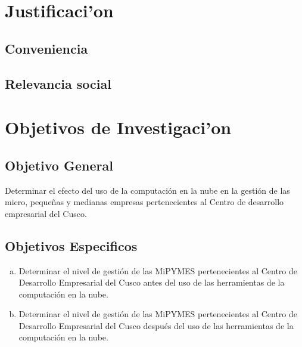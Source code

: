 \section{Justificaci'on}
\subsection{Conveniencia}

\subsection{Relevancia social}


\section{Objetivos de Investigaci'on}
\subsection{Objetivo General}
Determinar el efecto del uso de la computaci\'on en la nube en la gesti\'on de
las micro, peque\~nas y medianas empresas pertenecientes al Centro de desarrollo
empresarial del Cusco.
\subsection{Objetivos Especificos}
\begin{enumerate}[a.]
\item Determinar el nivel de gesti\'on de las MiPYMES pertenecientes al Centro de
Desarrollo Empresarial del Cusco antes del uso de las herramientas de la
computaci\'on en la nube.
\item Determinar el nivel de gesti\'on de las MiPYMES pertenecientes al Centro de
Desarrollo Empresarial del Cusco despu\'es del uso de las herramientas de la
computaci\'on en la nube.
\end{enumerate}
